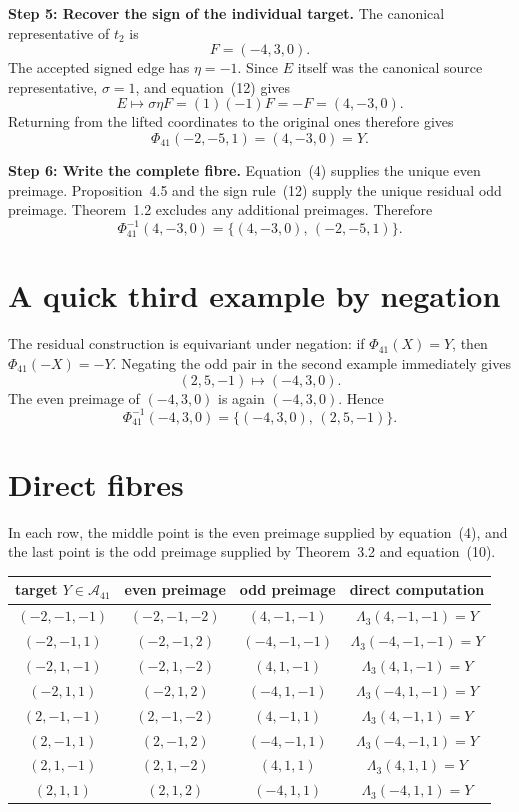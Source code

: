 \documentclass[11pt]{amsart}
\newcommand{\A}{\mathcal A_{41}}
\newcommand{\PhiMap}{\Phi_{41}}
\begin{document}
\medskip
\noindent\textbf{Step 5: Recover the sign of the individual target.}
The canonical representative of \(t_2\) is
\[
 F=(-4,3,0).
\]
The accepted signed edge has \(\eta=-1\).  Since \(E\) itself was the
canonical source representative, \(\sigma=1\), and equation~(12) gives
\[
 E\longmapsto \sigma\eta F=(1)(-1)F=-F=(4,-3,0).
\]
Returning from the lifted coordinates to the original ones therefore gives
\[
 \PhiMap(-2,-5,1)=(4,-3,0)=Y.
\]

\medskip
\noindent\textbf{Step 6: Write the complete fibre.}
Equation~(4) supplies the unique even preimage.  Proposition~4.5 and the sign
rule~(12) supply the unique residual odd preimage.  Theorem~1.2 excludes any
additional preimages.  Therefore
\[
 \boxed{\PhiMap^{-1}(4,-3,0)
 =\{(4,-3,0),\,(-2,-5,1)\}.}
\]

\section*{A quick third example by negation}

The residual construction is equivariant under negation: if
\(\PhiMap(X)=Y\), then \(\PhiMap(-X)=-Y\).  Negating the odd pair in the
second example immediately gives
\[
 (2,5,-1)\longmapsto(-4,3,0).
\]
The even preimage of \((-4,3,0)\) is again \((-4,3,0)\).  Hence
\[
 \PhiMap^{-1}(-4,3,0)
 =\{(-4,3,0),\,(2,5,-1)\}.
\]

\section*{Direct fibres}

In each row, the middle point is the even preimage supplied by equation~(4),
and the last point is the odd preimage supplied by Theorem~3.2 and
equation~(10).

\begin{center}
\small
\renewcommand{\arraystretch}{1.22}
\begin{tabular}{@{}c c c c@{}}
\toprule
target $Y\in\A$ & even preimage & odd preimage & direct computation \\
\midrule
$(-2,-1,-1)$ & $(-2,-1,-2)$ & $(4,-1,-1)$
  & $\Lambda_3(4,-1,-1)=Y$ \\
$(-2,-1, 1)$ & $(-2,-1, 2)$ & $(-4,-1,-1)$
  & $\Lambda_3(-4,-1,-1)=Y$ \\
$(-2, 1,-1)$ & $(-2, 1,-2)$ & $(4, 1,-1)$
  & $\Lambda_3(4,1,-1)=Y$ \\
$(-2, 1, 1)$ & $(-2, 1, 2)$ & $(-4,1,-1)$
  & $\Lambda_3(-4,1,-1)=Y$ \\
$( 2,-1,-1)$ & $( 2,-1,-2)$ & $(4,-1,1)$
  & $\Lambda_3(4,-1,1)=Y$ \\
$( 2,-1, 1)$ & $( 2,-1, 2)$ & $(-4,-1,1)$
  & $\Lambda_3(-4,-1,1)=Y$ \\
$( 2, 1,-1)$ & $( 2, 1,-2)$ & $(4,1,1)$
  & $\Lambda_3(4,1,1)=Y$ \\
$( 2, 1, 1)$ & $( 2, 1, 2)$ & $(-4,1,1)$
  & $\Lambda_3(-4,1,1)=Y$ \\
\bottomrule
\end{tabular}
\end{center}
\end{document}
